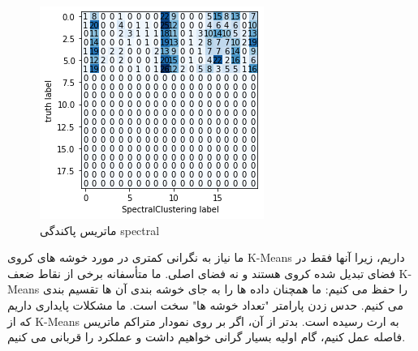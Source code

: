 \documentclass{article}
\begin{document}
\begin{figure}[h]
	\centering
	\includegraphics[width=0.7\linewidth]{Photo/SC2}
	\caption[ماتریس پاکندگی spectral]{ماتریس پاکندگی spectral}
	\label{fig:sc2}
\end{figure}
ما نیاز به نگرانی کمتری در مورد خوشه های کروی K-Means داریم، زیرا آنها فقط در فضای تبدیل شده کروی هستند و نه فضای اصلی. ما متأسفانه برخی از نقاط ضعف K-Means را حفظ می کنیم: ما همچنان داده ها را به جای خوشه بندی آن ها تقسیم بندی می کنیم. حدس زدن پارامتر "تعداد خوشه ها" سخت است. ما مشکلات پایداری داریم که از K-Means به ارث رسیده است. بدتر از آن، اگر بر روی نمودار متراکم ماتریس فاصله عمل کنیم، گام اولیه بسیار گرانی خواهیم داشت و عملکرد را قربانی می کنیم.
\end{document}

